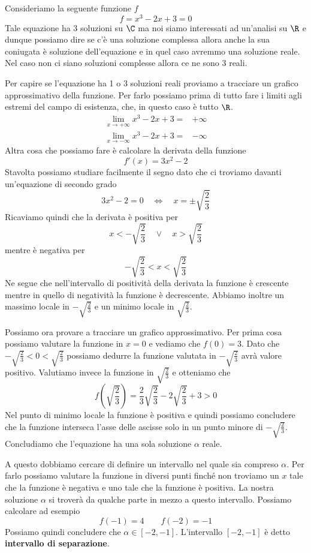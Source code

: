 \begin{example}
	Consideriamo la seguente funzione $f$
	\[ f = x^3 - 2x + 3 = 0 \]
	Tale equazione ha 3 soluzioni su $\C$ ma noi siamo interessati ad un'analisi su $\R$ e dunque possiamo dire
	se c'è una soluzione complessa allora anche la sua coniugata è soluzione dell'equazione e in quel caso
	avremmo una soluzione reale. Nel caso non ci siano soluzioni complesse allora ce ne sono 3 reali.

	Per capire se l'equazione ha 1 o 3 soluzioni reali proviamo a tracciare un grafico approssimativo della
	funzione. Per farlo possiamo prima di tutto fare i limiti agli estremi del campo di esistenza, che, in
	questo caso è tutto $\R$.
	\begin{align*}
		\lim_{x \to +\infty} x^3 - 2x + 3 = & +\infty \\
		\lim_{x \to -\infty} x^3 - 2x + 3 = & -\infty
	\end{align*}
	Altra cosa che possiamo fare è calcolare la derivata della funzione
	\[ f'(x) = 3x^2 - 2 \]
	Stavolta possiamo studiare facilmente il segno dato che ci troviamo davanti un'equazione di secondo grado
	\[ 3x^2 - 2 = 0 \quad \Leftrightarrow \quad x = \pm \sqrt{\frac{2}{3}} \]
	Ricaviamo quindi che la derivata è positiva per
	\[ x < -\sqrt{\frac{2}{3}} \quad \vee \quad x > \sqrt{\frac{2}{3}} \]
	mentre è negativa per
	\[ -\sqrt{\frac{2}{3}} < x < \sqrt{\frac{2}{3}} \]
	Ne segue che nell'intervallo di positività della derivata la funzione è crescente mentre in quello di
	negatività la funzione è decrescente. Abbiamo inoltre un massimo locale in $-\sqrt{\frac{2}{3}}$ e un
	minimo locale in $\sqrt{\frac{2}{3}}$.

	Possiamo ora provare a tracciare un grafico approssimativo. Per prima cosa possiamo valutare la funzione in
	$x = 0$ e vediamo che $f(0) = 3$. Dato che $-\sqrt{\frac{2}{3}} < 0 < \sqrt{\frac{2}{3}}$ possiamo dedurre
	la funzione valutata in $-\sqrt{\frac{2}{3}}$ avrà valore positivo. Valutiamo invece la funzione in
	$\sqrt{\frac{2}{3}}$ e otteniamo che
	\[ f \left( \sqrt{\frac{2}{3}} \right) = \frac{2}{3} \sqrt{\frac{2}{3}} - 2 \sqrt{\frac{2}{3}} + 3 > 0 \]
	Nel punto di minimo locale la funzione è positiva e quindi possiamo concludere che la funzione interseca
	l'asse delle ascisse solo in un punto minore di $-\sqrt{\frac{2}{3}}$. Concludiamo che l'equazione ha una
	sola soluzione $\alpha$ reale.

	A questo dobbiamo cercare di definire un intervallo nel quale sia compreso $\alpha$. Per farlo possiamo
	valutare la funzione in diversi punti finché non troviamo un $x$ tale che la funzione è negativa e uno
	tale che la funzione è positiva. La nostra soluzione $\alpha$ si troverà da qualche parte in mezzo a questo
	intervallo. Possiamo calcolare ad esempio
	\[ f(-1) = 4 \quad \quad f(-2) = -1 \]
	Possiamo quindi concludere che $\alpha \in [-2, -1]$. L'intervallo $[-2, -1]$ è detto
	\textbf{intervallo di separazione}.
\end{example}

